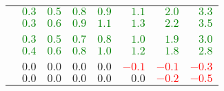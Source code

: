 \begin{center}
\begin{tabular}{lrrrrrrr}
    \uslpropGsecTwin{}          & \textcolor{Green}{$0.3$} & \textcolor{Green}{$0.5$} & \textcolor{Green}{$0.8$} & \textcolor{Green}{$0.9$} & \textcolor{Green}{$1.1$} & \textcolor{Green}{$2.0$} & \textcolor{Green}{$3.3$} \\
    \usruleTwin{}               & \textcolor{Green}{$0.3$} & \textcolor{Green}{$0.6$} & \textcolor{Green}{$0.9$} & \textcolor{Green}{$1.1$} & \textcolor{Green}{$1.3$} & \textcolor{Green}{$2.2$} & \textcolor{Green}{$3.5$} \\
    \multicolumn{8}{c}{\epi{}} \\
    \uslpropGsecTwin{}          & \textcolor{Green}{$0.3$} & \textcolor{Green}{$0.5$} & \textcolor{Green}{$0.7$} & \textcolor{Green}{$0.8$} & \textcolor{Green}{$1.0$} & \textcolor{Green}{$1.9$} & \textcolor{Green}{$3.0$} \\
    \usruleTwin{}               & \textcolor{Green}{$0.4$} & \textcolor{Green}{$0.6$} & \textcolor{Green}{$0.8$} & \textcolor{Green}{$1.0$} & \textcolor{Green}{$1.2$} & \textcolor{Green}{$1.8$} & \textcolor{Green}{$2.8$} \\
    \multicolumn{8}{c}{\kiw{}} \\
    \uslpropGsecTwin{}          & $0.0$                    & $0.0$                    & $0.0$                    & $0.0$                    & \textcolor{Red}{$-0.1$}  & \textcolor{Red}{$-0.1$}  & \textcolor{Red}{$-0.3$}  \\
    \usruleTwin{}               & $0.0$                    & $0.0$                    & $0.0$                    & $0.0$                    & $0.0$                    & \textcolor{Red}{$-0.2$}  & \textcolor{Red}{$-0.5$}  \\
    \bottomrule
  \end{tabular}
\end{center}
